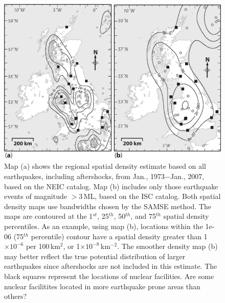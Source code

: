 \documentclass[10pt]{article}
\begin{document}
\begin{figure}
\centering
\includegraphics{./figures/UK_kernel.pdf}
\caption{Map (a) shows the regional spatial density estimate based on all earthquakes, including aftershocks, from Jan., 1973$-$Jan., 2007, based on the NEIC catalog. Map (b) includes only those earthquake events of magnitude $> 3$\,ML, based on the ISC catalog. Both spatial density maps use bandwidths chosen by the SAMSE method.  The maps are contoured at the 1$^{st}$, 25$^{th}$, 50$^{th}$, and 75$^{th}$ spatial density percentiles. As an example, using map (b), locations within the 1e-06 (75$^{th}$ percentile) contour have a spatial density greater than 1$\times 10^{-6}$ per 100\,km$^2$, or 1$\times 10^{-8}$\,km$^{-2}$. The smoother density map (b) may better reflect the true potential distribution of larger earthquakes since aftershocks are not included in this estimate. The black squares represent the locations of nuclear facilities. Are some nuclear facilitites located in more earthquake prone areas than others?}
\label{UK_kernel}
\end{figure}
\end{document}
